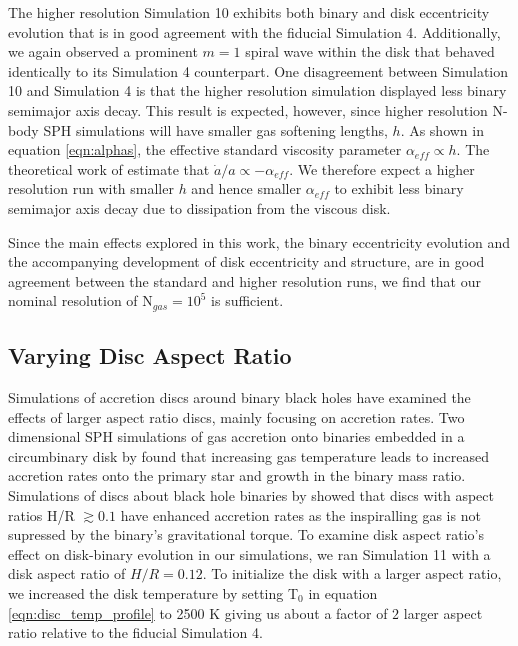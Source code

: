  The higher resolution Simulation 10 exhibits both binary and disk eccentricity evolution that is in good agreement with the fiducial Simulation 4.  
 Additionally, we again observed a prominent $m = 1$ spiral wave within the disk that behaved identically to its Simulation 4 counterpart.  One disagreement 
 between Simulation 10 and Simulation 4 is that the higher resolution simulation displayed less binary semimajor axis decay.  This result is expected, 
 however, since higher resolution N-body SPH simulations will have smaller gas softening lengths, $h$.  As shown in equation \ref{eqn:alphas}, the effective 
 standard viscosity parameter $\alpha_{eff} \propto h$.  The theoretical work of \citet{Arty96b,Arty2000} estimate that $\dot{a}/a 
 \propto -\alpha_{eff}$.  We therefore expect a higher resolution run with smaller $h$ and hence smaller $\alpha_{eff}$ to exhibit less binary semimajor axis 
 decay due to dissipation from the viscous disk.
 
Since the main effects explored in this work, the binary eccentricity evolution and the accompanying development of disk eccentricity and structure, are 
in good agreement between the standard and higher resolution runs, we find that our nominal resolution of N$_{gas} = 10^5$ is sufficient.

	
\subsection{Varying Disc Aspect Ratio}

Simulations of accretion discs around binary black holes have examined the effects of larger aspect ratio discs, mainly focusing on accretion rates.  
Two dimensional SPH simulations of gas accretion onto binaries embedded in a circumbinary disk by \citet{Young15} found that increasing gas temperature 
leads to increased accretion rates onto the primary star and growth in the binary mass ratio.  Simulations of discs about black hole binaries by \citet{Ragusa16} 
showed that discs with aspect ratios H/R $\gtrsim 0.1$ have enhanced accretion rates as the inspiralling gas is not supressed by the binary's gravitational 
torque.  To examine disk aspect ratio's effect on disk-binary evolution in our simulations, we ran Simulation 11 with a disk aspect ratio of $H/R = 0.12$.  To 
initialize the disk with a larger aspect ratio, we increased the disk temperature by setting T$_0$ in equation \ref{eqn:disc_temp_profile} to 2500 K giving us 
about a factor of $2$ larger aspect ratio relative to the fiducial Simulation 4.

